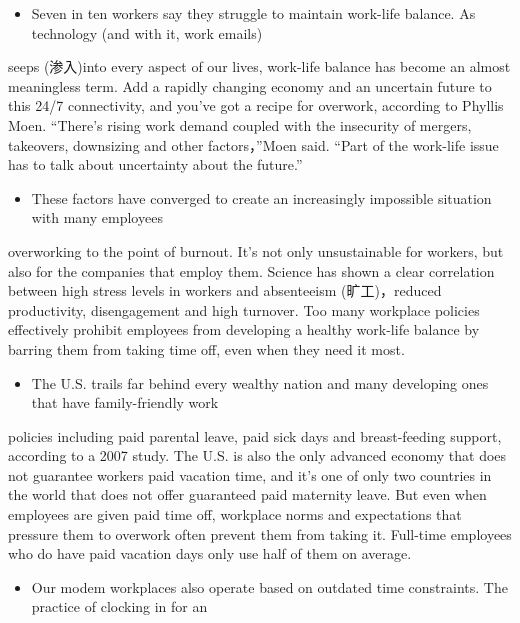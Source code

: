 \documentclass[UTF8,11pt]{ctexart}
\begin{document}
\begin{itemize}[leftmargin=2em,itemsep=.2em,topsep=.4em]\item[D.] Seven in ten workers say they struggle to maintain work-life balance. As technology (and with it, work emails)
\end{itemize}

seeps (渗入)into every aspect of our lives, work-life balance has become an almost meaningless term. Add a rapidly changing economy and an uncertain future to this 24/7 connectivity, and you’ve got a recipe for overwork, according to Phyllis Moen. “There’s rising work demand coupled with the insecurity of mergers, takeovers, downsizing and other factors，”Moen said. “Part of the work-life issue has to talk about uncertainty about the future.”


\begin{itemize}[leftmargin=2em,itemsep=.2em,topsep=.4em]\item[E.] These factors have converged to create an increasingly impossible situation with many employees
\end{itemize}

overworking to the point of burnout. It’s not only unsustainable for workers, but also for the companies that employ them. Science has shown a clear correlation between high stress levels in workers and absenteeism (旷工)，reduced productivity, disengagement and high turnover. Too many workplace policies effectively prohibit employees from developing a healthy work-life balance by barring them from taking time off, even when they need it most.


\begin{itemize}[leftmargin=2em,itemsep=.2em,topsep=.4em]\item[F.] The U.S. trails far behind every wealthy nation and many developing ones that have family-friendly work
\end{itemize}

policies including paid parental leave, paid sick days and breast-feeding support, according to a 2007 study. The U.S. is also the only advanced economy that does not guarantee workers paid vacation time, and it’s one of only two countries in the world that does not offer guaranteed paid maternity leave. But even when employees are given paid time off, workplace norms and expectations that pressure them to overwork often prevent them from taking it. Full-time employees who do have paid vacation days only use half of them on average.


\begin{itemize}[leftmargin=2em,itemsep=.2em,topsep=.4em]\item[G.] Our modem workplaces also operate based on outdated time constraints. The practice of clocking in for an
\end{itemize}
\end{document}

